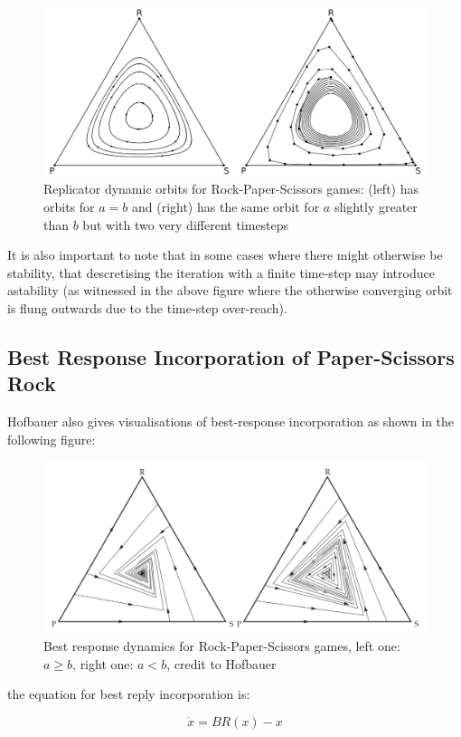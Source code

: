 \documentclass[journal,article,accept,oneauthors,pdftex,10pt,a4paper]{mdpi}
\begin{document}
\begin{figure}[ht]
\centering
\includegraphics[width=0.8\linewidth]{orbit1}
\caption{Replicator dynamic orbits for Rock-Paper-Scissors games: (left) has orbits for $a=b$ and (right) has the same orbit for $a$ slightly greater than $b$ but with two very different timesteps}
\label{fig:states}
\end{figure}

It is also important to note that in some cases where there might otherwise be stability, that descretising the iteration with a finite time-step may introduce astability (as witnessed in the above figure where the otherwise converging orbit is flung outwards due to the time-step over-reach).

\subsection{Best Response Incorporation of Paper-Scissors Rock}

Hofbauer\cite{psr1} also gives visualisations of best-response incorporation as shown in the following figure:

\begin{figure}[ht]
\centering
\includegraphics[width=0.8\linewidth]{rps2}
\caption{Best response dynamics for Rock-Paper-Scissors
games, left one: $a\ge b$, right one: $a < b$, credit to Hofbauer\cite{psr1}}
\label{fig:states}
\end{figure}

the equation for best reply incorporation is:

$$ \dot{x}=BR(x)-x $$
\end{document}
